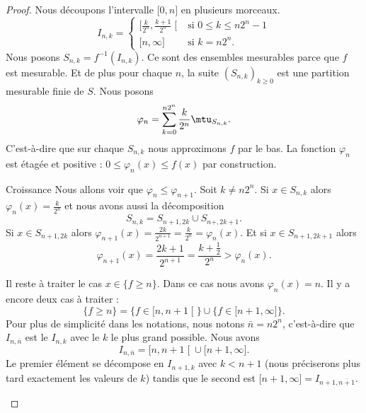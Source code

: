 \begin{proof}
    Nous découpons l'intervalle \( \mathopen[ 0 , n \mathclose]\) en plusieurs morceaux.
    \begin{equation}
        I_{n,k}=\begin{cases}
            \mathopen[ \frac{ k }{ 2^n } , \frac{ k+1 }{ 2^n } \mathclose[    &   \text{si } 0\leq k\leq n2^n-1\\
                \mathopen[ n , \infty \mathclose]    &    \text{si } k=n2^n.
        \end{cases}
    \end{equation}
    Nous posons \( S_{n,k}=f^{-1}(I_{n,k})\). Ce sont des ensembles mesurables parce que \( f\) est mesurable. Et de plus pour chaque \( n\), la suite \( (S_{n,k})_{k\geq 0}\) est une partition mesurable finie de \( S\). Nous posons
    \begin{equation}
        \varphi_n=\sum_{k=0}^{n2^n}\frac{ k }{ 2^n }\mtu_{S_{n,k}}.
    \end{equation}
    C'est-à-dire que sur chaque \( S_{n,k}\) nous approximons \( f\) par le bas. La fonction \( \varphi_n\) est étagée et positive : \( 0\leq \varphi_n(x)\leq f(x)\) par construction.
    \begin{subproof}
    \item[Croissance]
        Nous allons voir que \( \varphi_n\leq \varphi_{n+1}\). Soit \( k\neq n2^n\). Si \( x\in S_{n,k}\) alors \( \varphi_n(x)=\frac{ k }{ 2^n }\) et nous avons aussi la décomposition
        \begin{equation}
            S_{n,k}=S_{n+1,2k}\cup S_{n+,2k+1}.
        \end{equation}
        Si \( x\in S_{n+1,2k}\) alors \( \varphi_{n+1}(x)=\frac{ 2k }{ 2^{n+1} }=\frac{ k }{ 2^n }=\varphi_n(x)\). Et si \( x\in S_{n+1,2k+1}\) alors
        \begin{equation}
            \varphi_{n+1}(x)=\frac{ 2k+1 }{ 2^{n+1} }=\frac{ k+\frac{ 1 }{2} }{ 2^n }>\varphi_n(x).
        \end{equation}

        Il reste à traiter le cas \( x\in\{ f\geq n \}\). Dans ce cas nous avons \( \varphi_n(x)=n\). Il y a encore deux cas à traiter :
        \begin{equation}
            \{ f\geq n \}=\{ f\in\mathopen[ n , n+1 \mathclose[ \}\cup\{ f\in\mathopen[ n+1 , \infty \mathclose] \}.
        \end{equation}
        Pour plus de simplicité dans les notations, nous notons \( \bar n=n2^n\), c'est-à-dire que \( I_{n,\bar n}\) est le \( I_{n,k}\) avec le \( k\) le plus grand possible. Nous avons
        \begin{equation}
            I_{n,\bar n}=\mathopen[ n , n+1 \mathclose[\cup\mathopen[ n+1 , \infty \mathclose].
        \end{equation}
        Le premier élément se décompose en \( I_{n+1,k}\) avec \( k<n+1\) (nous préciserons plus tard exactement les valeurs de \( k\)) tandis que le second est \( \mathopen[ n+1 , \infty \mathclose]=I_{n+1,\overline{ n+1 }}\).


\end{subproof}
\end{proof}
